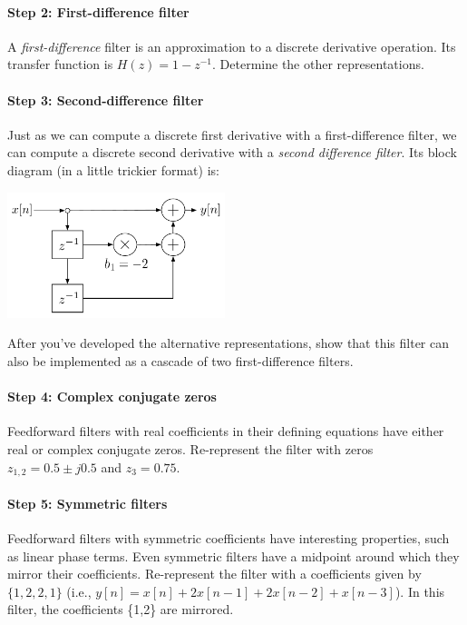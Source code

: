 \paragraph{Step 2: First-difference filter} A \emph{first-difference} filter is an
	approximation to a discrete derivative operation. Its transfer
	function is $H(z) = 1 - z^{-1}$. Determine the other representations.

	
\paragraph{Step 3: Second-difference filter} Just as we can compute a discrete
	first derivative with a first-difference filter, we can compute a
	discrete second derivative with a \emph{second difference filter}. Its
	block diagram (in a little trickier format) is:
	
	\centerline{\includegraphics[width=2.5in]{lab5/second-difference-bdiag}}
	
	After you've developed the alternative representations, show that
	this filter can also be implemented as a cascade of two
	first-difference filters.
	
\paragraph{Step 4: Complex conjugate zeros} Feedforward filters with real
	coefficients in their defining equations have either real or complex
	conjugate zeros. Re-represent the filter with zeros $z_{1,2} = 0.5 \pm
	j 0.5$ and $z_3 = 0.75$.

\paragraph{Step 5: Symmetric filters} Feedforward filters with
        symmetric coefficients have interesting properties, such as
        linear phase terms. Even symmetric filters have a midpoint
        around which they mirror their coefficients. Re-represent the
        filter with a coefficients given by $\{1,2,2,1\}$ (i.e.,
        $y[n]=x[n]+2x[n-1]+2x[n-2]+x[n-3]$). In this filter, the
        coefficients \{1,2\} are mirrored.


